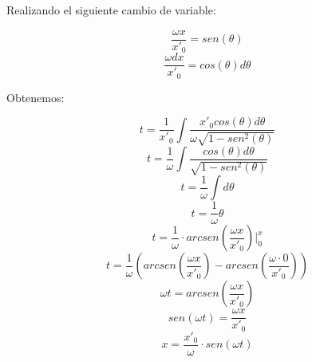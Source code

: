 \documentclass[letter,11pt]{article}
\begin{document}
Realizando el siguiente cambio de variable:

\begin{equation*}
    \frac{\omega x}{x'_0} = sen(\theta)
\end{equation*}
\begin{equation*}
    \frac{\omega dx}{x'_0} = cos(\theta) d\theta
\end{equation*}

Obtenemos:

\begin{equation*}
    t = \frac{1}{x'_0} \int \frac{x'_0 cos(\theta) d\theta}{\omega \sqrt{1 - sen^2(\theta)}}
\end{equation*}
\begin{equation*}
    t = \frac{1}{\omega} \int \frac{cos(\theta) d\theta}{\sqrt{1 - sen^2(\theta)}}
\end{equation*}
\begin{equation*}
    t = \frac{1}{\omega} \int d\theta
\end{equation*}
\begin{equation*}
    t = \frac{1}{\omega} \theta
\end{equation*}
\begin{equation*}
    t = \frac{1}{\omega} \cdot arcsen\left(\frac{\omega x}{x'_0} \right) \Biggr|_{0}^{x}
\end{equation*}
\begin{equation*}
    t = \frac{1}{\omega} \left( arcsen\left(\frac{\omega x}{x'_0}\right) - arcsen\left(\frac{\omega \cdot 0}{x'_0}\right) \right)
\end{equation*}
\begin{equation*}
    \omega t = arcsen\left(\frac{\omega x}{x'_0}\right)
\end{equation*}
\begin{equation*}
    sen(\omega t) = \frac{\omega x}{x'_0}
\end{equation*}
\begin{equation}
    x = \frac{x'_0}{\omega} \cdot sen(\omega t)
\end{equation}
\end{document}
